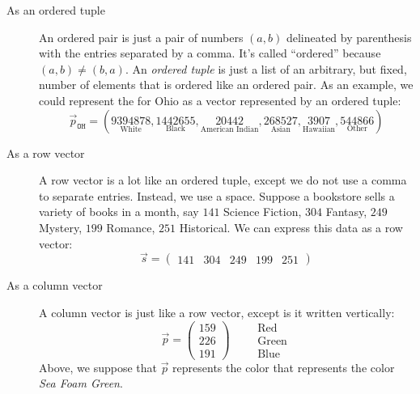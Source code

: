 \documentclass{ximera}
\begin{document}
\begin{concept}
\begin{description}
\item[As an ordered tuple] An ordered pair is just a pair of numbers
  $(a,b)$ delineated by parenthesis with the entries separated by a
  comma. It's called ``ordered'' because $(a,b) \ne (b,a)$. An \textit{ordered
  tuple} is just a list of an arbitrary, but fixed, number of elements
  that is ordered like an ordered pair. As an example, we could
  represent the  for Ohio as a vector
  represented by an ordered tuple:
  \[
  \vec{p}_{\texttt{OH}} = (\underset{\text{White}}{9394878},\underset{\text{Black}}{1442655},\underset{\text{American Indian}}{20442},\underset{\text{Asian}}{268527},\underset{\text{Hawaiian}}{3907},\underset{\text{Other}}{544866})
  \]
\item[As a row vector] A row vector is a lot like an ordered tuple,
  except we do not use a comma to separate entries. Instead, we use a
  space.  Suppose a bookstore sells a variety of books in a month, say
  $141$ Science Fiction,
  $304$ Fantasy,
  $249$ Mystery,
  $199$ Romance,
  $251$ Historical.
  We can express this data as a row vector:
  \[
  \vec{s} = \begin{pmatrix}141 & 304 & 249 & 199 & 251 \end{pmatrix}
  \]
  \item[As a column vector] A column vector is just like a row vector,
  except is it written vertically:
  \[
  \vec{p} = \begin{pmatrix}
    159\\  226 \\ 191\end{pmatrix}
    \qquad
    \begin{array}{l}
    \text{Red}\\
    \text{Green}\\
    \text{Blue}
    \end{array}
  \]
  Above, we suppose that $\vec{p}$ represents the color that
  represents the color \textit{Sea Foam Green}.

\end{description}
\end{concept}
\end{document}
